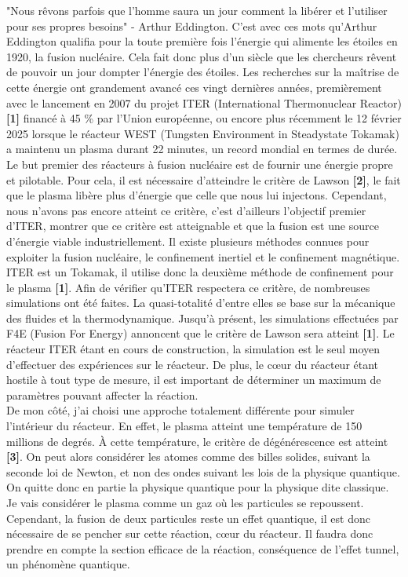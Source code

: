 \documentclass{article}
\begin{document}
"Nous rêvons parfois que l'homme saura un jour comment la libérer et l'utiliser pour ses propres besoins" - Arthur Eddington. C'est avec ces mots qu'Arthur Eddington qualifia pour la toute première fois l'énergie qui alimente les étoiles en 1920, la fusion nucléaire. Cela fait donc plus d'un siècle que les chercheurs rêvent de pouvoir un jour dompter l'énergie des étoiles. Les recherches sur la maîtrise de cette énergie ont grandement avancé ces vingt dernières années, premièrement avec le lancement en 2007 du projet ITER (International Thermonuclear Reactor) \textbf{[1]} financé à 45 \% par l'Union européenne, ou encore plus récemment le 12 février 2025 lorsque le réacteur WEST (Tungsten Environment in Steadystate Tokamak) a maintenu un plasma durant 22 minutes, un record mondial en termes de durée. \\
Le but premier des réacteurs à fusion nucléaire est de fournir une énergie propre et pilotable. Pour cela, il est nécessaire d'atteindre le critère de Lawson \textbf{[2]}, le fait que le plasma libère plus d'énergie que celle que nous lui injectons. Cependant, nous n'avons pas encore atteint ce critère, c'est d'ailleurs l'objectif premier d'ITER, montrer que ce critère est atteignable et que la fusion est une source d'énergie viable industriellement. Il existe plusieurs méthodes connues pour exploiter la fusion nucléaire, le confinement inertiel et le confinement magnétique. ITER est un Tokamak, il utilise donc la deuxième méthode de confinement pour le plasma \textbf{[1]}. Afin de vérifier qu'ITER respectera ce critère, de nombreuses simulations ont été faites. La quasi-totalité d'entre elles se base sur la mécanique des fluides et la thermodynamique. Jusqu'à présent, les simulations effectuées par F4E (Fusion For Energy) annoncent que le critère de Lawson sera atteint \textbf{[1]}. Le réacteur ITER étant en cours de construction, la simulation est le seul moyen d'effectuer des expériences sur le réacteur. De plus, le cœur du réacteur étant hostile à tout type de mesure, il est important de déterminer un maximum de paramètres pouvant affecter la réaction. \\
De mon côté, j'ai choisi une approche totalement différente pour simuler l'intérieur du réacteur. En effet, le plasma atteint une température de 150 millions de degrés. À cette température, le critère de dégénérescence est atteint \textbf{[3]}. On peut alors considérer les atomes comme des billes solides, suivant la seconde loi de Newton, et non des ondes suivant les lois de la physique quantique. On quitte donc en partie la physique quantique pour la physique dite classique. Je vais considérer le plasma comme un gaz où les particules se repoussent. Cependant, la fusion de deux particules reste un effet quantique, il est donc nécessaire de se pencher sur cette réaction, cœur du réacteur. Il faudra donc prendre en compte la section efficace de la réaction, conséquence de l'effet tunnel, un phénomène quantique.
\end{document}
